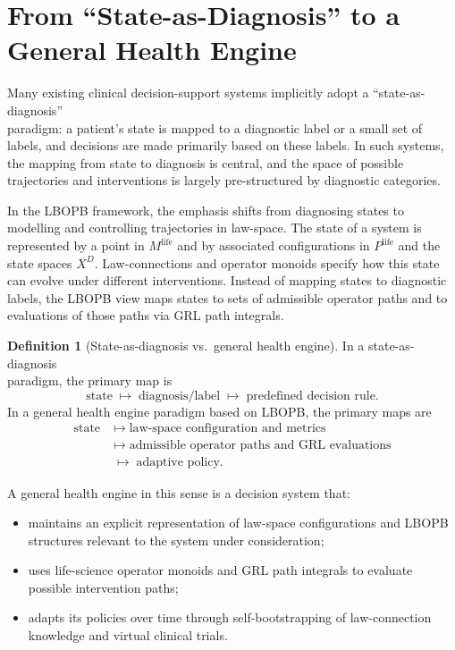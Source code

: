 \documentclass[11pt]{book}
\theoremstyle{plain}
\theoremstyle{definition}
\newtheorem{definition}[theorem]{Definition}
\theoremstyle{remark}
\begin{document}
\section{From ``State-as-Diagnosis'' to a General Health Engine}


Many existing clinical decision-support systems implicitly adopt a
``state-as-diagnosis'' \\paradigm: a patient's state is mapped to a
diagnostic label or a small set of labels, and decisions are made
primarily based on these labels. In such systems, the mapping from
state to diagnosis is central, and the space of possible trajectories
and interventions is largely pre-structured by diagnostic categories.

In the LBOPB framework, the emphasis shifts from diagnosing states
to modelling and controlling trajectories in law-space. The state of
a system is represented by a point in $M^{\mathrm{life}}$ and by
associated configurations in $P^{\mathrm{life}}$ and the state spaces
$X^{D}$. Law-connections and operator monoids specify how this state
can evolve under different interventions. Instead of mapping states to
diagnostic labels, the LBOPB view maps states to sets of admissible
operator paths and to evaluations of those paths via GRL path
integrals.

\begin{definition}[State-as-diagnosis vs.\ general health engine]
In a state-as-diagnosis \\paradigm, the primary map is
\[
  \text{state} \;\mapsto\; \text{diagnosis/label}
  \;\mapsto\; \text{predefined decision rule}.
\]
In a general health engine paradigm based on LBOPB, the primary maps
are
\begin{align*}
  \text{state}
  &\;\mapsto\; \text{law-space configuration and metrics} \\
  &\;\mapsto\; \text{admissible operator paths and GRL evaluations} \\
  &\;\mapsto\; \text{adaptive policy}.
\end{align*}
\end{definition}

A general health engine in this sense is a decision system that:

\begin{itemize}
  \item maintains an explicit representation of law-space configurations
        and LBOPB structures relevant to the system under consideration;
  \item uses life-science operator monoids and GRL path integrals to
        evaluate possible intervention paths;
  \item adapts its policies over time through self-bootstrapping of
        law-connection knowledge and virtual clinical trials.
\end{itemize}
\end{document}
